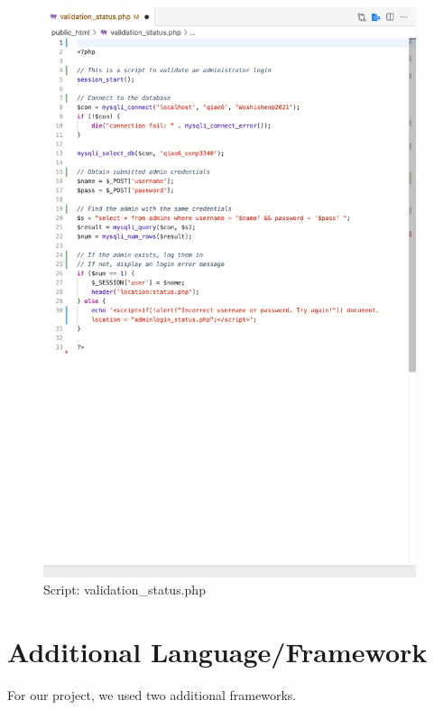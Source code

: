 \documentclass[12pt, letterpaper]{article}
\begin{document}
\begin{figure}[htbp]
	\centering
	\includegraphics[width=4.3in]{images/22-script-5.png}
	\caption{Script: validation\_status.php}
 \end{figure}

 \newpage

\section{Additional Language/Framework}
For our project, we used two additional frameworks. 
\end{document}
